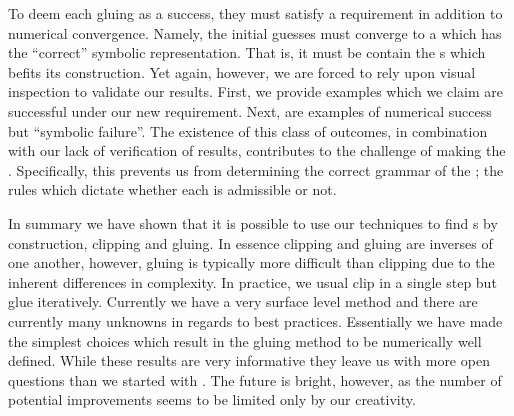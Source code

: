 To deem each gluing as a success, they must satisfy a {\symbolic} requirement
in addition to numerical convergence. Namely, the initial guesses must converge
to a {\po} which has the ``correct'' symbolic representation.
That is, it must be contain the {\fpo}s which befits its construction.
Yet again, however, we are forced to rely upon visual inspection to validate our results.
First, we provide examples which we claim are successful under our new requirement.
Next, are examples of numerical success but ``symbolic failure''.
The existence of this class of outcomes, in combination with our lack of verification of results,
contributes to the challenge of making the {\symbolic}. Specifically,
this prevents us from determining the correct grammar of
the {\symbolic}; the rules which dictate whether each {\brick} is admissible {\po} or not.

In summary we have shown that it is possible to use our techniques to find {\po}s by construction,
clipping and gluing. In essence
clipping and gluing are inverses of one another, however, gluing is
typically more difficult than clipping due to the inherent differences in complexity. In practice,
we usual clip in a single step but glue iteratively.
Currently we have a very surface level method and there are currently many unknowns in regards to best practices. Essentially we have made the simplest choices which result in the gluing method to be
numerically well defined. While these results are very informative they leave us with more open
questions than we started with . The future is bright, however, as the number of potential improvements seems to be limited only by our creativity.
